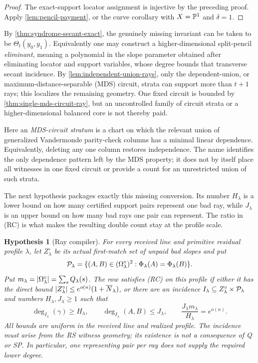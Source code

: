 \documentclass[11pt,a4paper]{amsart}
\numberwithin{equation}{section}
\newtheorem{hypothesis}[theorem]{Hypothesis}
\theoremstyle{remark}
\begin{document}
\begin{proof}
The exact-support locator assignment is injective by the preceding proof.
Apply \cref{lem:pencil-payment}, or the curve corollary with
\(X=\mathbb P^1\) and \(\delta=1\).
\end{proof}

By \cref{thm:syndrome-secant-exact}, the genuinely missing invariant can
be taken to be \(\Theta_t(y_0,y_1)\).  Equivalently one may construct a
higher-dimensional split-pencil \emph{eliminant}, meaning a polynomial in
the slope parameter obtained after eliminating locator and support
variables, whose degree bounds that
transverse secant incidence.  By
\cref{lem:independent-union-rays}, only the dependent-union, or
maximum-distance-separable (MDS) circuit,
strata can support more than \(t+1\) rays; this localizes the remaining
geometry.  One fixed circuit is bounded by
\cref{thm:single-mds-circuit-ray}, but an uncontrolled family of circuit
strata or a higher-dimensional balanced core is not thereby paid.

Here an \emph{MDS-circuit stratum} is a chart on which the relevant union
of generalized Vandermonde parity-check columns has a minimal linear
dependence.  Equivalently, deleting any one column restores independence.
The name identifies the only dependence pattern left by the MDS property;
it does not by itself place all witnesses in one fixed circuit or provide
a count for an unrestricted union of such strata.

The next hypothesis packages exactly this missing conversion.  Its number
\(H_\lambda\) is a lower bound on how many certified support pairs represent
one bad ray, while \(J_\lambda\) is an upper bound on how many bad rays one
pair can represent.  The ratio in \textup{(RC)} is what makes the resulting
double count stay at the profile scale.

\begin{hypothesis}[Ray compiler]\label{hyp:ray-compiler}
For every received line and primitive residual profile \(\lambda\), let
\(Z_\lambda^\circ\) be its actual first-match set of unpaid bad slopes and
put
\[
\mathcal P_\lambda=\{(A,B)\in(\Omega^{\circ}_\lambda)^2:
                       \Phi_\lambda(A)=\Phi_\lambda(B)\}.
\]
Put \(m_\lambda=\lvert \Omega^{\circ}_\lambda\rvert=\sum_sQ_\lambda(s)\).
The row satisfies \textup{(RC)} on this profile if either it has the direct
bound \(\lvert Z_\lambda^\circ\rvert\le e^{o(n)}(1+\overline N_\lambda)\), or there are
an incidence
\(I_\lambda\subseteq Z_\lambda^\circ\times\mathcal P_\lambda\) and numbers
\(H_\lambda,J_\lambda\ge1\) such that
\[
 \deg_{I_\lambda}(\gamma)\ge H_\lambda,\qquad
 \deg_{I_\lambda}(A,B)\le J_\lambda,\qquad
 \frac{J_\lambda m_\lambda}{H_\lambda}=e^{o(n)}.
 \tag{RC}\label{eq:ray-compiler}
\]
All bounds are uniform in the received line and realized profile.  The
incidence must arise from the RS witness geometry; its existence is not a
consequence of Q or SP.  In particular, one representing pair per ray does
not supply the required lower degree.
\end{hypothesis}
\end{document}
